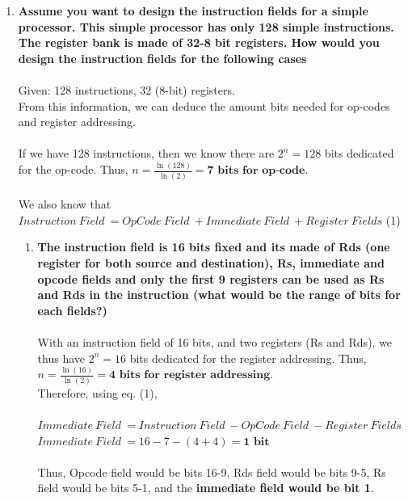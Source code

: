 \documentclass{article}
\begin{document}
\begin{enumerate}
	\item \textbf{Assume you want to design the instruction fields for a simple processor. This simple processor has only 128 simple instructions. The register bank is made of 32-8 bit registers. How would you design the instruction fields for the following cases}
	\\ \\
	Given: 128 instructions, 32 (8-bit) registers. \\
	From this information, we can deduce the amount bits needed for op-codes and register addressing. \\ \\
	If we have 128 instructions, then we know there are $2^n = 128$ bits dedicated for the op-code. Thus, $n = \frac{\ln(128)}{\ln(2)}= \textbf{7 bits for op-code}$. \\ \\ 
	We also know that \\ 
	\hspace{1cm} $Instruction\ Field\ = OpCode\ Field\ +Immediate\ Field\ + Register\ Fields$ (1)
	\begin{enumerate}
	    \item \textbf{The instruction field is 16 bits fixed and its made of Rds (one register for both source and destination), Rs,  immediate and opcode fields and only the first 9 registers can be used as Rs and 
        Rds in the instruction (what would be the range of bits for each fields?)} \\ \\
        With an instruction field of 16 bits, and two registers (Rs and Rds), we thus have $2^n = 16$ bits dedicated for the register addressing. Thus, $n = \frac{\ln(16)}{\ln(2)}= \textbf{4 bits for register addressing}$. \\
        Therefore, using eq. (1), \\ \\
        $Immediate\ Field\ = Instruction\ Field\ - OpCode\ Field\ - Register\ Fields $ \\
        $Immediate\ Field\ = 16 - 7 - (4 + 4) = \textbf{1 bit} $\\ \\
        Thus, Opcode field would be bits 16-9, Rds field would be bits 9-5, Rs field would be bits 5-1, and the \textbf{immediate field would be bit 1}. \\ 
        

\end{enumerate}
\end{enumerate}
\end{document}
